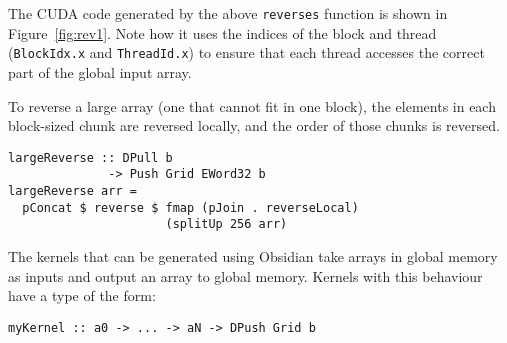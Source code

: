 The CUDA code generated by the above \verb!reverses! function is shown in 
Figure~\ref{fig:rev1}. Note how it uses the indices of the block 
and thread (\verb!BlockIdx.x! and \verb!ThreadId.x!)
to ensure that each thread accesses the correct part of
the global input array.







To reverse a large array (one that cannot fit in one block), the elements
in each block-sized chunk are reversed locally, and the order of those chunks is reversed.


\begin{small} 
\begin{verbatim} 
largeReverse :: DPull b
              -> Push Grid EWord32 b
largeReverse arr =
  pConcat $ reverse $ fmap (pJoin . reverseLocal)
                      (splitUp 256 arr) 
\end{verbatim} 
\end{small} 

The kernels that can be generated using Obsidian take arrays 
in global memory as inputs and output an array to global memory. 
Kernels with this behaviour have a type of the form: 

\begin{small} 
\begin{Verbatim}[samepage=true]
myKernel :: a0 -> ... -> aN -> DPush Grid b 
\end{Verbatim} 
\end{small} 

